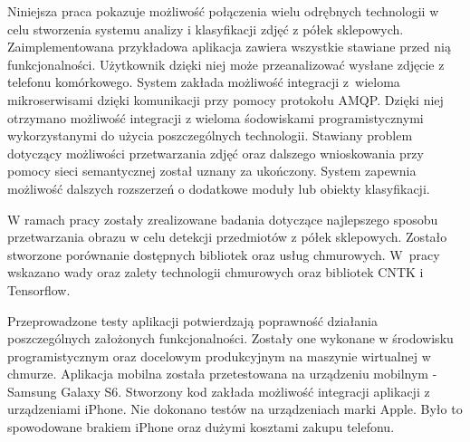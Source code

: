 Niniejsza praca pokazuje możliwość połączenia wielu odrębnych technologii w celu stworzenia systemu analizy i klasyfikacji zdjęć z półek sklepowych. Zaimplementowana przykładowa aplikacja zawiera wszystkie stawiane przed nią funkcjonalności. Użytkownik dzięki niej może przeanalizować wysłane zdjęcie z telefonu komórkowego. System zakłada możliwość integracji z~wieloma mikroserwisami dzięki komunikacji przy pomocy protokołu AMQP. Dzięki niej otrzymano możliwość integracji z wieloma śodowiskami programistycznymi wykorzystanymi do użycia poszczególnych technologii. Stawiany problem dotyczący możliwości przetwarzania zdjęć oraz dalszego wnioskowania przy pomocy sieci semantycznej został uznany za ukończony. System zapewnia możliwość dalszych rozszerzeń o dodatkowe moduły lub obiekty klasyfikacji. 

W ramach pracy zostały zrealizowane badania dotyczące najlepszego sposobu przetwarzania obrazu w celu detekcji przedmiotów z półek sklepowych. Zostało stworzone porównanie dostępnych bibliotek oraz usług chmurowych. W~pracy wskazano wady oraz zalety technologii chmurowych oraz bibliotek CNTK i Tensorflow. 

Przeprowadzone testy aplikacji potwierdzają poprawność działania poszczególnych założonych funkcjonalności. Zostały one wykonane w środowisku programistycznym oraz docelowym produkcyjnym na maszynie wirtualnej w chmurze. Aplikacja mobilna została przetestowana na urządzeniu mobilnym - Samsung Galaxy S6. Stworzony kod zakłada możliwość integracji aplikacji z urządzeniami iPhone. Nie dokonano testów na urządzeniach marki Apple. Było to spowodowane brakiem iPhone oraz dużymi kosztami zakupu telefonu.